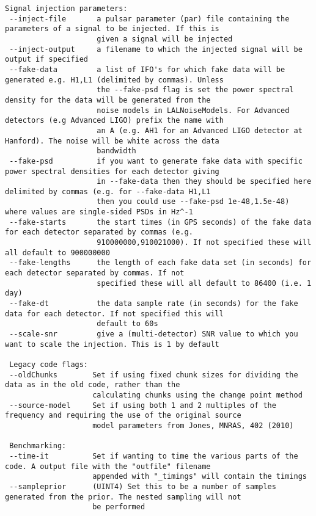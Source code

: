 \begin{lstlisting}[frame=single]
 Signal injection parameters:
 --inject-file       a pulsar parameter (par) file containing the parameters of a signal to be injected. If this is
                     given a signal will be injected
 --inject-output     a filename to which the injected signal will be output if specified
 --fake-data         a list of IFO's for which fake data will be generated e.g. H1,L1 (delimited by commas). Unless
                     the --fake-psd flag is set the power spectral density for the data will be generated from the
                     noise models in LALNoiseModels. For Advanced detectors (e.g Advanced LIGO) prefix the name with
                     an A (e.g. AH1 for an Advanced LIGO detector at Hanford). The noise will be white across the data
                     bandwidth
 --fake-psd          if you want to generate fake data with specific power spectral densities for each detector giving
                     in --fake-data then they should be specified here delimited by commas (e.g. for --fake-data H1,L1
                     then you could use --fake-psd 1e-48,1.5e-48) where values are single-sided PSDs in Hz^-1
 --fake-starts       the start times (in GPS seconds) of the fake data for each detector separated by commas (e.g.
                     910000000,910021000). If not specified these will all default to 900000000
 --fake-lengths      the length of each fake data set (in seconds) for each detector separated by commas. If not
                     specified these will all default to 86400 (i.e. 1 day)
 --fake-dt           the data sample rate (in seconds) for the fake data for each detector. If not specified this will
                     default to 60s
 --scale-snr         give a (multi-detector) SNR value to which you want to scale the injection. This is 1 by default

 Legacy code flags:
 --oldChunks        Set if using fixed chunk sizes for dividing the data as in the old code, rather than the
                    calculating chunks using the change point method
 --source-model     Set if using both 1 and 2 multiples of the frequency and requiring the use of the original source
                    model parameters from Jones, MNRAS, 402 (2010)

 Benchmarking:
 --time-it          Set if wanting to time the various parts of the code. A output file with the "outfile" filename
                    appended with "_timings" will contain the timings
 --sampleprior      (UINT4) Set this to be a number of samples generated from the prior. The nested sampling will not
                    be performed
\end{lstlisting}

